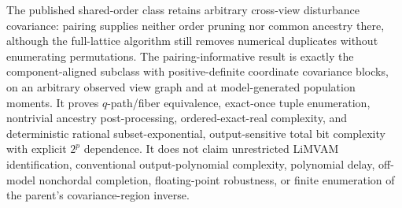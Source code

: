 \documentclass{article}
\begin{document}
The published shared-order class retains arbitrary cross-view disturbance covariance: pairing supplies neither order pruning nor common ancestry there, although the full-lattice algorithm still removes numerical duplicates without enumerating permutations. The pairing-informative result is exactly the component-aligned subclass with positive-definite coordinate covariance blocks, on an arbitrary observed view graph and at model-generated population moments. It proves \(q\)-path/fiber equivalence, exact-once tuple enumeration, nontrivial ancestry post-processing, ordered-exact-real complexity, and deterministic rational subset-exponential, output-sensitive total bit complexity with explicit \(2^p\) dependence. It does not claim unrestricted LiMVAM identification, conventional output-polynomial complexity, polynomial delay, off-model nonchordal completion, floating-point robustness, or finite enumeration of the parent's covariance-region inverse.
\end{document}
